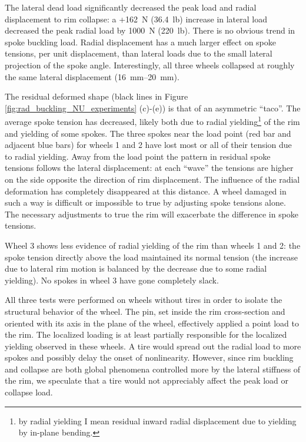 \documentclass[\rootdir/thesis.tex]{subfiles}
\begin{document}
The lateral dead load significantly decreased the peak load and radial displacement to rim collapse: a +\SI{162}{N} (\SI{36.4}{lb}) increase in lateral load decreased the peak radial load by \SI{1000}{N} (\SI{220}{lb}). There is no obvious trend in spoke buckling load. Radial displacement has a much larger effect on spoke tensions, per unit displacement, than lateral loads due to the small lateral projection of the spoke angle. Interestingly, all three wheels collapsed at roughly the same lateral displacement (\SIrange{16}{20}{mm}).

The residual deformed shape (black lines in Figure \ref{fig:rad_buckling_NU_experiments} (c)-(e)) is that of an asymmetric ``taco''. The average spoke tension has decreased, likely both due to radial yielding\footnote{by radial yielding I mean residual inward radial displacement due to yielding by in-plane bending.} of the rim and yielding of some spokes. The three spokes near the load point (red bar and adjacent blue bars) for wheels 1 and 2 have lost most or all of their tension due to radial yielding. Away from the load point the pattern in residual spoke tensions follows the lateral displacement: at each ``wave'' the tensions are higher on the side opposite the direction of rim displacement. The influence of the radial deformation has completely disappeared at this distance. A wheel damaged in such a way is difficult or impossible to true by adjusting spoke tensions alone. The necessary adjustments to true the rim will exacerbate the difference in spoke tensions.

Wheel 3 shows less evidence of radial yielding of the rim than wheels 1 and 2: the spoke tension directly above the load maintained its normal tension (the increase due to lateral rim motion is balanced by the decrease due to some radial yielding). No spokes in wheel 3 have gone completely slack.

All three tests were performed on wheels without tires in order to isolate the structural behavior of the wheel. The pin, set inside the rim cross-section and oriented with its axis in the plane of the wheel, effectively applied a point load to the rim. The localized loading is at least partially responsible for the localized yielding observed in these wheels. A tire would spread out the radial load to more spokes and possibly delay the onset of nonlinearity. However, since rim buckling and collapse are both global phenomena controlled more by the lateral stiffness of the rim, we speculate that a tire would not appreciably affect the peak load or collapse load.
\end{document}
